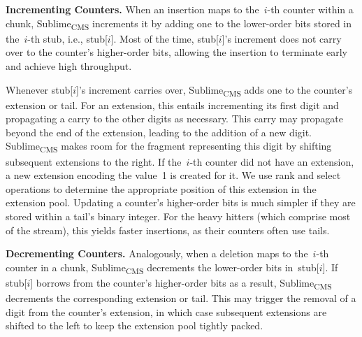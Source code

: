 \documentclass[sigconf]{acmart}
\newcommand{\sketch}{Sublime}
\newcommand{\sketchcms}{\sketch\textsubscript{CMS}\xspace}
\begin{document}
\textbf{Incrementing Counters.}
When an insertion maps to the~$i${\nobreakdash-}th counter within a chunk,
\sketchcms increments it by adding one to the lower-order bits stored in
the~$i${\nobreakdash-}th stub, i.e., stub[$i$]. Most of the time, stub[$i$]'s
increment does not carry over to the counter's higher-order bits, allowing the
insertion to terminate early and achieve high throughput.

Whenever stub[$i$]'s increment carries over, \sketchcms adds one to the
counter's extension or tail. For an extension, this entails incrementing its
first digit and propagating a carry to the other digits as necessary. This
carry may propagate beyond the end of the extension, leading to the addition of
a new digit. \sketchcms makes room for the fragment representing this digit by
shifting subsequent extensions to the right. If the~$i${\nobreakdash-}th
counter did not have an extension, a new extension encoding the value~1 is
created for it. We use rank and select operations to determine the appropriate
position of this extension in the extension pool. Updating a counter's
higher-order bits is much simpler if they are stored within a tail's binary
integer. For the heavy hitters (which comprise most of the stream), this yields
faster insertions, as their counters often use tails.


\textbf{Decrementing Counters.}
Analogously, when a deletion maps to the~$i${\nobreakdash-}th counter in a
chunk, \sketchcms decrements the lower-order bits in~stub[$i$]. If stub[$i$]
borrows from the counter's higher-order bits as a result, \sketchcms decrements
the corresponding extension or tail. This may trigger the removal of a digit
from the counter's extension, in which case subsequent extensions are shifted
to the left to keep the extension pool tightly packed. 
\end{document}
